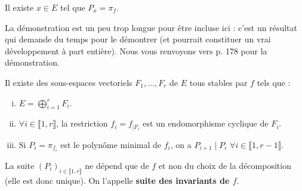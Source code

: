 
	\begin{lemma}
		\label{invariants-de-similitude-2}
		Il existe $x \in E$ tel que $P_x = \pi_f$.
	\end{lemma}

	\begin{remark}
		La démonstration est un peu trop longue pour être incluse ici : c'est un résultat qui demande du temps pour le démontrer (et pourrait constituer un vrai développement à part entière). Nous vous renvoyons vers \cite{[GOU21]} p. 178 pour la démonstration.
	\end{remark}

	\begin{theorem}[Frobenius]
		Il existe des sous-espaces vectoriels $F_1, \dots, F_r$ de $E$ tous stables par $f$ tels que :
		\begin{enumerate}[(i)]
			\item $E = \bigoplus_{i = 1}^r F_i$.
			\item $\forall i \in \llbracket 1, r \rrbracket$, la restriction $f_i = f_{|F_i}$ est un endomorphisme cyclique de $F_i$.
			\item Si $P_i = \pi_{f_i}$ est le polynôme minimal de $f_i$, on a $P_{i+1} \mid P_i$ $\forall i \in \llbracket 1, r-1 \rrbracket$.
		\end{enumerate}
		La suite $(P_i)_{i \in \llbracket 1, r \rrbracket}$ ne dépend que de $f$ et non du choix de la décomposition (elle est donc unique). On l'appelle \textbf{suite des invariants de $f$}.
	\end{theorem}

